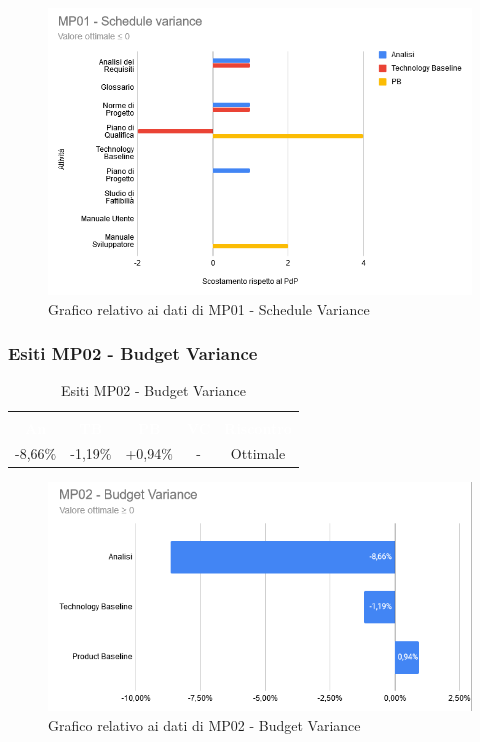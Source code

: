 \begin{figure}[H]
\centering
\includegraphics[scale=0.7]{./img/MP01_schedule_variance.png}
\caption{Grafico relativo ai dati di MP01 - Schedule Variance}
\end{figure}

\subsubsection{Esiti MP02 - Budget Variance}
\begin{longtable}{c c c c c}
\rowcolor{white}\caption{Esiti MP02 - Budget Variance} \\
		\rowcolor{redafk}
\textcolor{white}{\textbf{An}} &
\textcolor{white}{\textbf{TB}} &
\textcolor{white}{\textbf{PB}} &
\textcolor{white}{\textbf{VC}} &
\textcolor{white}{\textbf{Riscontro}} \\
-8,66$\%$ &
-1,19$\%$ &
+0,94$\%$ &
- &
Ottimale \\
\end{longtable}

\begin{figure}[H]
\centering
\includegraphics[scale=0.7]{./img/MP02_budget_variance.png}
\caption{Grafico relativo ai dati di MP02 - Budget Variance}
\end{figure}

